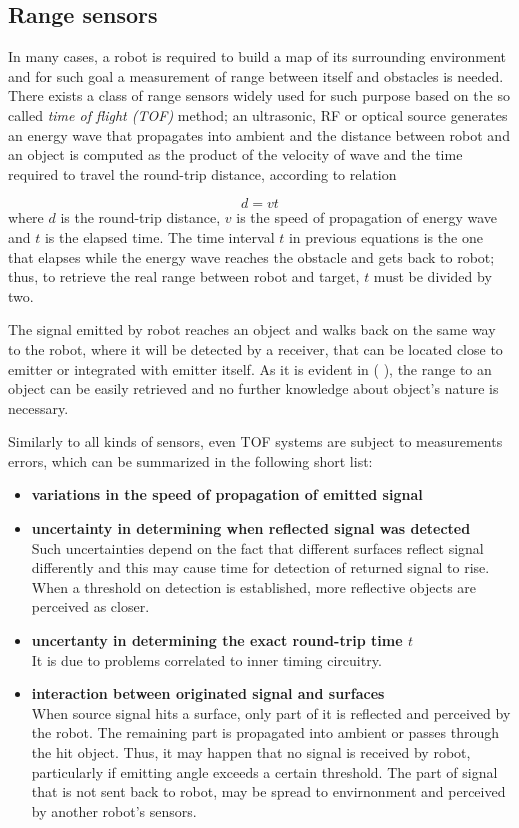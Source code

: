 \documentclass[a4paper, onecolumn]{report}
\begin{document}
\subsection{Range sensors}
In many cases, a robot is required to build a map of its surrounding environment and for such goal a measurement of range between itself and obstacles is needed.
There exists a class of range sensors widely used for such purpose based on the so called \emph{time of flight (TOF)} method; an ultrasonic, RF or optical source generates an energy wave that propagates into ambient and the distance between robot and an object is computed as the product of the velocity of wave and the time required to travel the round-trip distance, according to relation

\begin{equation}
	d = vt
\end{equation}
where $d$ is the round-trip distance, $v$ is the speed of propagation of energy wave and $t$ is the elapsed time. The time interval $t$ in previous equations is the one that elapses while the energy wave reaches the obstacle and gets back to robot; thus, to retrieve the real range between robot and target, $t$ must be divided by two.

The signal emitted by robot reaches an object and walks back on the same way to the robot, where it will be detected by a receiver, that can be located close to emitter or integrated with emitter itself.
As it is evident in ( ), the range to an object can be easily retrieved and no further knowledge about object's nature is necessary.

Similarly to all kinds of sensors, even TOF systems are subject to measurements errors, which can be summarized in the following short list:
\begin{itemize}
\item{\bf{variations in the speed of propagation of emitted signal}}
\item{\textbf{uncertainty in determining when reflected signal was detected}\\ 
Such uncertainties depend on the fact that different surfaces reflect signal differently and this may cause time for detection of returned signal to rise. When a threshold on detection is established, more reflective objects are perceived as closer.}
\item{\textbf{uncertanty in determining the exact round-trip time $t$}\\
 It is due to problems correlated to inner timing circuitry.}
\item{\textbf{interaction between originated signal and surfaces} \\
When source signal hits a surface, only part of it is reflected and perceived by the robot. The remaining part is propagated into ambient or passes through the hit object. Thus, it may happen that no signal is received by robot, particularly if emitting angle exceeds a certain threshold. The part of signal that is not sent back to robot, may be spread to envirnonment and perceived by another robot's sensors.}
\end{itemize}
\end{document}
